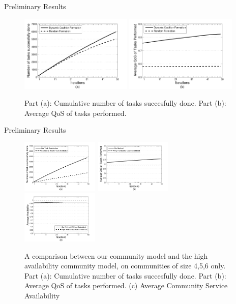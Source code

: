 \documentclass{beamer}
\begin{document}
\begin{frame}{Preliminary Results}
    \begin{figure}[!t]
        \centering
        \includegraphics[width=2.1in]{figures/s2_task_done.pdf}
        \includegraphics[width=2.1in]{figures/s2_task_qos.pdf}
        \caption{Part (a): Cumulative number of tasks succesfully done. Part
        (b): Average QoS of tasks performed.} \label{performancemany}
    \end{figure}
\end{frame}

\begin{frame}{Preliminary Results}
    \begin{figure}[!t]
        \centering
        \includegraphics[width=1.45in]{figures/avg_task_ws_done.pdf}
        \includegraphics[width=1.45in]{figures/avg_qos_ws_done.pdf}
        \includegraphics[width=1.45in]{figures/avg_avail_ws_done.pdf}
        \caption{A comparison between our community model and the high availability community model, on communities of size 4,5,6 only. Part (a): Cumulative number of tasks succesfully done. Part
        (b): Average QoS of tasks performed. (c) Average Community Service Availability} \label{fig_avail_method}
    \end{figure}
\end{frame}
\end{document}
